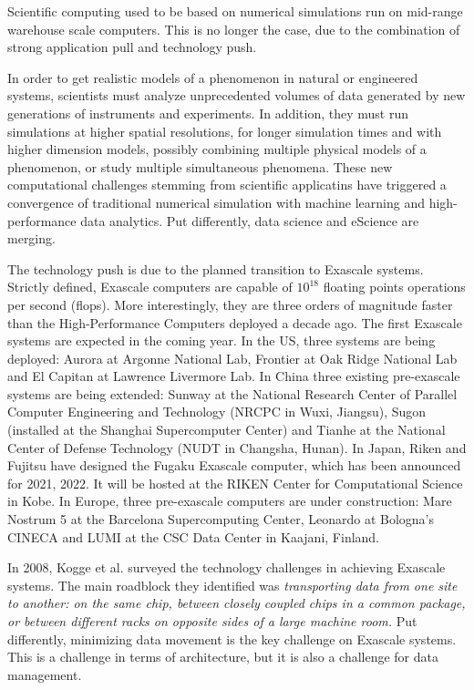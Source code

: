 \documentclass[11pt]{article}
\begin{document}
Scientific computing used to be based on numerical simulations run on mid-range warehouse scale computers.
This is no longer the case, due to the combination of strong application pull and technology push.
 
In order to get realistic models of a phenomenon in natural or engineered systems, scientists 
must analyze unprecedented volumes of data generated by new generations of instruments and experiments.
In addition, they must run simulations at higher spatial resolutions, for longer simulation times and with 
higher dimension models, possibly combining multiple physical models of a phenomenon, or study multiple 
simultaneous phenomena. These new computational challenges stemming from scientific applicatins
 have triggered a convergence of traditional
numerical simulation with machine learning and high-performance data analytics. Put differently,
data science and eScience are merging. 

The technology push is due to the planned transition to Exascale systems.
Strictly defined, Exascale computers are capable of $10^{18}$ floating points operations per second (flops).
More interestingly, they are three orders of magnitude faster than the High-Performance Computers deployed
a decade ago. 
The first Exascale systems are expected in the coming year. In the US, three systems are
being deployed: Aurora at Argonne National Lab, 
Frontier at Oak Ridge National Lab and El Capitan at Lawrence Livermore Lab. In China 
three existing pre-exascale systems are being extended: Sunway at the National Research Center of Parallel 
Computer Engineering and Technology (NRCPC in Wuxi, Jiangsu), Sugon (installed at the Shanghai Supercomputer
Center)  and Tianhe at the National Center 
of Defense Technology (NUDT in Changsha, Hunan).
In Japan, Riken and Fujitsu have designed the Fugaku Exascale computer, which has been announced for 2021, 2022. It
will be hosted at the RIKEN Center for Computational Science in Kobe.
In Europe, three pre-exascale computers are under construction: Mare Nostrum 5 at the Barcelona Supercomputing Center,
Leonardo at Bologna's CINECA and LUMI at the CSC Data Center in Kaajani, Finland.

In 2008, Kogge et al. surveyed the technology challenges in achieving Exascale systems.
The main roadblock they identified was {\em transporting data from one site to another: on the same chip, 
between closely coupled chips in a common package, or between different racks on opposite sides of a large
machine room.} Put differently, minimizing data movement is the key challenge on Exascale systems.
This is a challenge in terms of architecture, but it is also a challenge for data management.
\end{document}
